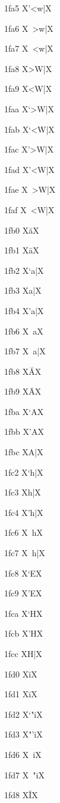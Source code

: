\documentclass[11pt]{article}
\begin{document}
1fa5 X{\textgreek{'<w|}}X

1fa6 X{\textgreek{~>w|}}X

1fa7 X{\textgreek{~<w|}}X

1fa8 X{\textgreek{>W|}}X

1fa9 X{\textgreek{<W|}}X

1faa X{\textgreek{`>W|}}X

1fab X{\textgreek{`<W|}}X

1fac X{\textgreek{'>W|}}X

1fad X{\textgreek{'<W|}}X

1fae X{\textgreek{~>W|}}X

1faf X{\textgreek{~<W|}}X

1fb0 X{\textgreek{\u{a}}}X

1fb1 X{\textgreek{\={a}}}X

1fb2 X{\textgreek{`a|}}X

1fb3 X{\textgreek{a|}}X

1fb4 X{\textgreek{'a|}}X

1fb6 X{\textgreek{~a}}X

1fb7 X{\textgreek{~a|}}X

1fb8 X{\textgreek{\u{A}}}X

1fb9 X{\textgreek{\={A}}}X

1fba X{\textgreek{`A}}X

1fbb X{\textgreek{'A}}X

1fbc X{\textgreek{A|}}X

1fc2 X{\textgreek{`h|}}X

1fc3 X{\textgreek{h|}}X

1fc4 X{\textgreek{'h|}}X

1fc6 X{\textgreek{~h}}X

1fc7 X{\textgreek{~h|}}X

1fc8 X{\textgreek{`E}}X

1fc9 X{\textgreek{'E}}X

1fca X{\textgreek{`H}}X

1fcb X{\textgreek{'H}}X

1fcc X{\textgreek{H|}}X

1fd0 X{\textgreek{\u{i}}}X

1fd1 X{\textgreek{\={i}}}X

1fd2 X{\textgreek{`"i}}X

1fd3 X{\textgreek{"'i}}X

1fd6 X{\textgreek{~i}}X

1fd7 X{\textgreek{~"i}}X

1fd8 X{\textgreek{\u{I}}}X
\end{document}
